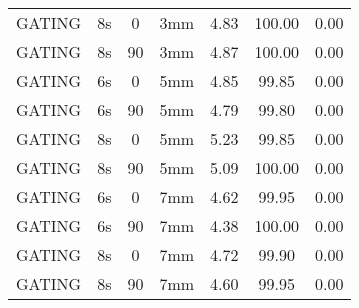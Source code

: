 \begin{table}[H]
\begin{tabular}{|c||c|c|c||c|c|c|}
GATING & 8s & 0 & 3mm & 4.83 & 100.00 & 0.00 \\
GATING & 8s & 90 & 3mm & 4.87 & 100.00 & 0.00 \\
GATING & 6s & 0 & 5mm & 4.85 & 99.85 & 0.00 \\
GATING & 6s & 90 & 5mm & 4.79 & 99.80 & 0.00 \\
GATING & 8s & 0 & 5mm & 5.23 & 99.85 & 0.00 \\
GATING & 8s & 90 & 5mm & 5.09 & 100.00 & 0.00 \\
GATING & 6s & 0 & 7mm & 4.62 & 99.95 & 0.00 \\
GATING & 6s & 90 & 7mm & 4.38 & 100.00 & 0.00 \\
GATING & 8s & 0 & 7mm & 4.72 & 99.90 & 0.00 \\
GATING & 8s & 90 & 7mm & 4.60 & 99.95 & 0.00 \\
    \hline\hline 
  \end{tabular}
\end{table}

\newpage

